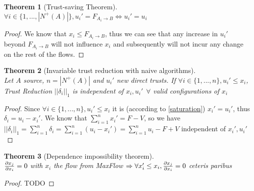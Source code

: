 \documentclass[11pt]{article}
\newtheorem{theorem}{Theorem}[section]
\theoremstyle{definition}
\theoremstyle{corollary}
\begin{document}
    \begin{theorem}[Trust-saving Theorem] \ \\
    \label{trustsave}
       $\forall i \in \{1,...,|N^{+}(A)|\}, u_i' = F_{A_i \rightarrow B} \Leftrightarrow u_i' = u_i$
    \end{theorem}
    \begin{proof}
       We know that $x_i \leq F_{A_i \rightarrow B}$, thus we can see that any increase in $u_i'$ beyond
       $F_{A_i \rightarrow B}$ will not influence $x_i$ and subsequently will not incur any change on the rest of the flows.
    \end{proof}

    \begin{theorem}[Invariable trust reduction with naive algorithms] \ \\
    \label{invariability}
       Let $A$ source, $n = |N^{+}(A)|$ and $u_i'$ new direct trusts. If $\forall i \in \{1,...,n\},u_i' \leq x_i$,
       Trust Reduction $||\delta_i||_1$ is independent of $x_i, u_i' \:\: \forall$ valid configurations of $x_i$
    \end{theorem}
    \begin{proof} 
       Since $\forall i \in \{1,...,n\},u_i' \leq x_i$ it is (according to \ref{saturation}) $x_i' = u_i'$, thus $\delta_i = u_i
       - x_i'$. We know that $\sum\limits_{i=1}^{n}x_i' = F - V$, so we have $||\delta_i||_1 = \sum\limits_{i=1}^{n}\delta_i =
       \sum\limits_{i=1}^{n}(u_i - x_i') = \sum\limits_{i=1}^{n}u_i - F + V$ independent of $x_i', u_i'$
    \end{proof}

    \begin{theorem}[Dependence impossibility theorem] \ \\
    \label{independence}
       ${\partial x_j \over \partial x_i} = 0$ with $x_i$ the flow from MaxFlow $\Rightarrow
         \forall x_i' \leq x_i, {\partial x_j \over \partial x_i} = 0$ ceteris paribus
    \end{theorem}
    \begin{proof}
       TODO
    \end{proof}
\end{document}

